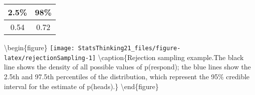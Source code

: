 \documentclass[]{book}
\newenvironment{Shaded}{\begin{snugshade}}{\end{snugshade}}
\newcommand{\KeywordTok}[1]{\textcolor[rgb]{0.13,0.29,0.53}{\textbf{#1}}}
\newcommand{\DecValTok}[1]{\textcolor[rgb]{0.00,0.00,0.81}{#1}}
\newcommand{\FloatTok}[1]{\textcolor[rgb]{0.00,0.00,0.81}{#1}}
\newcommand{\StringTok}[1]{\textcolor[rgb]{0.31,0.60,0.02}{#1}}
\newcommand{\CommentTok}[1]{\textcolor[rgb]{0.56,0.35,0.01}{\textit{#1}}}
\newcommand{\OperatorTok}[1]{\textcolor[rgb]{0.81,0.36,0.00}{\textbf{#1}}}
\newcommand{\NormalTok}[1]{#1}
\theoremstyle{definition}
\theoremstyle{definition}
\theoremstyle{definition}
\theoremstyle{remark}
\begin{document}
\begin{Shaded}
\end{Shaded}

\begin{longtable}[]{@{}cc@{}}
\toprule
\begin{minipage}[b]{0.09\columnwidth}\centering\strut
2.5\%\strut
\end{minipage} & \begin{minipage}[b]{0.09\columnwidth}\centering\strut
98\%\strut
\end{minipage}\tabularnewline
\midrule
\endhead
\begin{minipage}[t]{0.09\columnwidth}\centering\strut
0.54\strut
\end{minipage} & \begin{minipage}[t]{0.09\columnwidth}\centering\strut
0.72\strut
\end{minipage}\tabularnewline
\bottomrule
\end{longtable}

\textbackslash{}begin\{figure\}
\texttt{[image: StatsThinking21\_files/figure-latex/rejectionSampling-1]}
\textbackslash{}caption\{Rejection sampling example.The black line shows
the density of all possible values of p(respond); the blue lines show
the 2.5th and 97.5th percentiles of the distribution, which represent
the 95\% credible interval for the estimate of
p(heads).\}\label{fig:rejectionSampling} \textbackslash{}end\{figure\}
\end{document}

